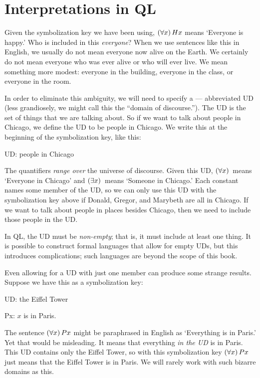 \section{Interpretations in QL}


Given the symbolization key we have been using, $(\forall x) \,Hx$ means `Everyone is happy.' Who is included in this \emph{everyone}? When we use sentences like this in English, we usually do not mean everyone now alive on the Earth. We certainly do not mean everyone who was ever alive or who will ever live. We mean something more modest: everyone in the building, everyone in the class, or everyone in the room.

In order to eliminate this ambiguity, we will need to specify a  --- abbreviated UD {\color{black} (less grandiosely, we might call this the ``domain of discourse.'')}. The UD is the set of things that we are talking about. So if we want to talk about people in Chicago, we define the UD to be people in Chicago. We write this at the beginning of the symbolization key, like this:
\begin{ekey}
\item[UD:] people in Chicago
\end{ekey}
The quantifiers \emph{range over} the universe of discourse. Given this UD, $(\forall x) \,$ means `Everyone in Chicago' and $(\exists x) \,$ means `Someone in Chicago.' Each constant names some member of the UD, so we can only use this UD with the symbolization key above if Donald, Gregor, and Marybeth are all in Chicago. If we want to talk about people in places besides Chicago, then we need to include those people in the UD.

In QL, the UD must be \emph{non-empty}; that is, it must include at least one thing. It is possible to construct formal languages that allow for empty UDs, but this introduces complications; such languages are beyond the scope of this book.

Even allowing for a UD with just one member can produce some strange results. Suppose we have this as a symbolization key:
\begin{ekey}
\item[UD:] the Eiffel Tower
\item[Px:] $x$ is in Paris.
\end{ekey}
The sentence $(\forall x) \, Px$ might be paraphrased in English as `Everything is in Paris.' Yet that would be misleading. It means that everything \emph{in the UD} is in Paris. This UD contains only the Eiffel Tower, so with this symbolization key $(\forall x) \, Px$ just means that the Eiffel Tower is in Paris. We will rarely work with such bizarre domains as this.

